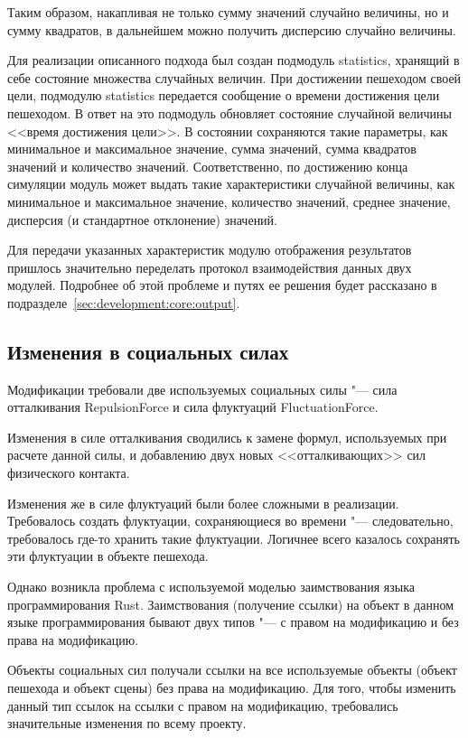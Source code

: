 Таким образом, накапливая не только сумму значений случайно величины, но и сумму квадратов, в дальнейшем можно получить дисперсию случайно величины.

Для реализации описанного подхода был создан подмодуль sta\-ti\-stics, хранящий в себе состояние множества случайных величин.
При достижении пешеходом своей цели, подмодулю sta\-ti\-stics передается сообщение о времени достижения цели пешеходом.
В ответ на это подмодуль обновляет состояние случайной величины <<время достижения цели>>.
В состоянии сохраняются такие параметры, как минимальное и максимальное значение, сумма значений, сумма квадратов значений и количество значений.
Соответственно, по достижению конца симуляции модуль может выдать такие характеристики случайной величины, как
минимальное и максимальное значение, количество значений, среднее значение, дисперсия (и стандартное отклонение) значений.

Для передачи указанных характеристик модулю отображения результатов пришлось значительно переделать протокол взаимодействия данных двух модулей.
Подробнее об этой проблеме и путях ее решения будет рассказано в подразделе~\ref{sec:development:core:output}.

\subsection{Изменения в социальных силах}
\label{sec:development:core:forces}

Модификации требовали две используемых социальных силы "--- сила отталкивания Re\-pul\-si\-on\-For\-ce и
сила флуктуаций Fluc\-tu\-a\-ti\-on\-For\-ce.

Изменения в силе отталкивания сводились к замене формул, используемых при расчете данной силы,
и добавлению двух новых <<отталкивающих>> сил физического контакта.

Изменения же в силе флуктуаций были более сложными в реализации.
Требовалось создать флуктуации, сохраняющиеся во времени "--- следовательно, требовалось где-то хранить такие флуктуации.
Логичнее всего казалось сохранять эти флуктуации в объекте пешехода.

Однако возникла проблема с используемой моделью заимствования языка программирования Rust.
Заимствования (получение ссылки) на объект в данном языке программирования бывают двух типов "---
с правом на модификацию и без права на модификацию.

Объекты социальных сил получали ссылки на все используемые объекты (объект пешехода и объект сцены)
без права на модификацию. Для того, чтобы изменить данный тип ссылок на ссылки с правом на модификацию,
требовались значительные изменения по всему проекту.

